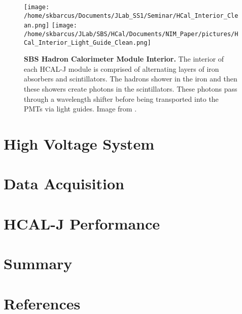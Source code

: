 \documentclass[review]{elsarticle}
\newcommand{\hcal}{HCAL-J }
\begin{document}
	\begin{figure}[!ht]
	\begin{center}
	\texttt{[image: /home/skbarcus/Documents/JLab\_SS1/Seminar/HCal\_Interior\_Clean.png]}
	\texttt{[image: /home/skbarcus/JLab/SBS/HCal/Documents/NIM\_Paper/pictures/HCal\_Interior\_Light\_Guide\_Clean.png]}
	\end{center}
	\caption{
	{\bf{SBS Hadron Calorimeter Module Interior.}} The interior of each \hcal module is comprised of alternating layers of iron absorbers and scintillators. The hadrons shower in the iron and then these showers create photons in the scintillators. These photons pass through a wavelength shifter before being transported into the PMTs via light guides. Image from \cite{brio_2018}.}
	\label{fig:HCal_interior}
	\end{figure}	
	

\section{High Voltage System}

\section{Data Acquisition}

\section{\hcal Performance}

\section{Summary}

\section*{References}


\end{document}

